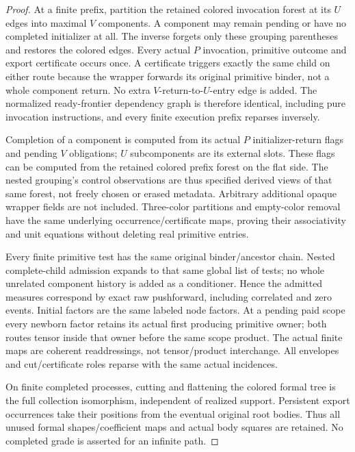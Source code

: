 \documentclass[11pt]{article}
\begin{document}
\begin{proof}
At a finite prefix, partition the retained colored invocation forest at its $U$ edges into maximal $V$ components. A component may remain pending or have no completed initializer at all. The inverse forgets only these grouping parentheses and restores the colored edges. Every actual $P$ invocation, primitive outcome and export certificate occurs once. A certificate triggers exactly the same child on either route because the wrapper forwards its original primitive binder, not a whole component return. No extra $V$-return-to-$U$-entry edge is added. The normalized ready-frontier dependency graph is therefore identical, including pure invocation instructions, and every finite execution prefix reparses inversely.

Completion of a component is computed from its actual $P$ initializer-return flags and pending $V$ obligations; $U$ subcomponents are its external slots. These flags can be computed from the retained colored prefix forest on the flat side. The nested grouping's control observations are thus specified derived views of that same forest, not freely chosen or erased metadata. Arbitrary additional opaque wrapper fields are not included. Three-color partitions and empty-color removal have the same underlying occurrence/certificate maps, proving their associativity and unit equations without deleting real primitive entries.

Every finite primitive test has the same original binder/ancestor chain. Nested complete-child admission expands to that same global list of tests; no whole unrelated component history is added as a conditioner. Hence the admitted measures correspond by exact raw pushforward, including correlated and zero events. Initial factors are the same labeled node factors. At a pending paid scope every newborn factor retains its actual first producing primitive owner; both routes tensor inside that owner before the same scope product. The actual finite maps are coherent readdressings, not tensor/product interchange. All envelopes and cut/certificate roles reparse with the same actual incidences.

On finite completed processes, cutting and flattening the colored formal tree is the full collection isomorphism, independent of realized support. Persistent export occurrences take their positions from the eventual original root bodies. Thus all unused formal shapes/coefficient maps and actual body squares are retained. No completed grade is asserted for an infinite path.\end{proof}
\end{document}
